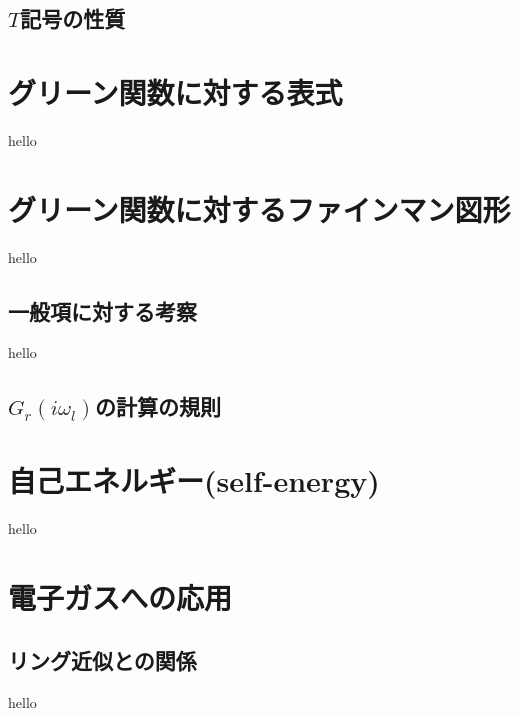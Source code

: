 \documentclass[dvipdfmx,11pt]{beamer}
\begin{document}
\subsection{$T$記号の性質}

\section{グリーン関数に対する表式}
\begin{frame}
    hello
\end{frame}

\section{グリーン関数に対するファインマン図形}
\begin{frame}
    hello
\end{frame}

\subsection{一般項に対する考察}
\begin{frame}
    hello
\end{frame}
\subsection{$G_r(i\omega_l)$の計算の規則}

\section{自己エネルギー(self-energy)}
\begin{frame}
    hello
\end{frame}

\section{電子ガスへの応用}
\subsection{リング近似との関係}
\begin{frame}
    hello
\end{frame}
\end{document}
